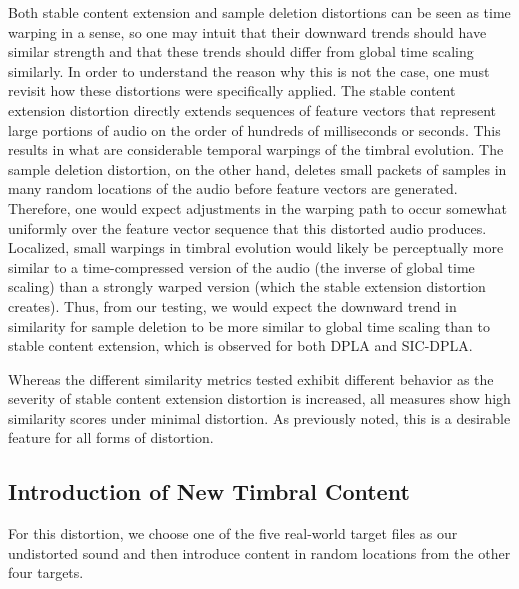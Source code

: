 \documentclass[12pt]{report} 	%
\numberwithin{figure}{chapter}
\numberwithin{table}{chapter}
\numberwithin{equation}{chapter}
\begin{document}
\begin{flushleft}
Both stable content extension and sample deletion distortions can be seen as time warping in a sense, so one may intuit that their downward trends should have similar strength and that these trends should differ from global time scaling similarly. In order to understand the reason why this is not the case, one must revisit how these distortions were specifically applied. The stable content extension distortion directly extends sequences of feature vectors that represent large portions of audio on the order of hundreds of milliseconds or seconds. This results in what are considerable temporal warpings of the timbral evolution. The sample deletion distortion, on the other hand, deletes small packets of samples in many random locations of the audio before feature vectors are generated. Therefore, one would expect adjustments in the warping path to occur somewhat uniformly over the feature vector sequence that this distorted audio produces. Localized, small warpings in timbral evolution would likely be perceptually more similar to a time-compressed version of the audio (the inverse of global time scaling) than a strongly warped version (which the stable extension distortion creates). Thus, from our testing, we would expect the downward trend in similarity for sample deletion to be more similar to global time scaling than to stable content extension, which is observed for both DPLA and SIC-DPLA.

Whereas the different similarity metrics tested exhibit different behavior as the severity of stable content extension distortion is increased, all measures show high similarity scores under minimal distortion. As previously noted, this is a desirable feature for all forms of distortion.

\vspace{12pt}
\subsection{Introduction of New Timbral Content}
For this distortion, we choose one of the five real-world target files as our undistorted sound and then introduce content in random locations from the other four targets. 


\end{flushleft}
\end{document}
